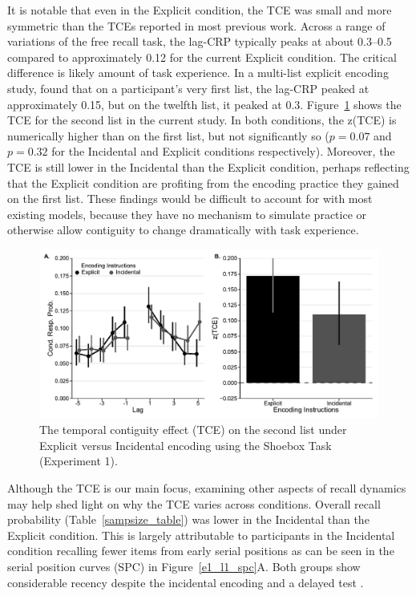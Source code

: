 \documentclass[man,natbib,floatsintext]{apa6} %
\begin{document}
\color{red}
\label{TODO-5}
It is notable that even in the Explicit condition, the TCE was small and more symmetric than the TCEs reported in most previous work. Across a range of variations of the free recall task, the lag-CRP typically peaks at about 0.3--0.5 \citep{HealKaha17} compared to approximately 0.12 for the current Explicit condition. The critical difference is likely amount of task experience. In a multi-list explicit encoding study, \citet{HealKaha17} found that on a participant's very first list, the lag-CRP peaked at approximately 0.15, but on the twelfth list, it peaked at 0.3. Figure~\ref{e1_l2_crp} shows the TCE for the second list in the current study. In both conditions, the z(TCE) is numerically higher than on the first list, but not significantly so ($p=0.07$ and $p=0.32$ for the Incidental and Explicit conditions respectively)\label{t1}. Moreover, the TCE is still lower in the Incidental than the Explicit condition, perhaps reflecting that the Explicit condition are profiting from the encoding practice they gained on the first list. These findings would be difficult to account for with most existing models, because they have no mechanism to simulate practice or otherwise allow contiguity to change dramatically with task experience.

\begin{figure}
\includegraphics{figures/E1_crp_list2.pdf}
\caption{The temporal contiguity effect (TCE) on the second list under Explicit versus Incidental encoding using the Shoebox Task (Experiment 1). \paneltext}
\label{e1_l2_crp}
\end{figure}

\color{black}


\color{red}
\label{TODO-6}
Although the TCE is our main focus, \label{SPCtalk} examining other aspects of recall dynamics may help shed light on why the TCE varies across conditions. Overall recall probability (Table~\ref{sampsize_table}) was lower in the Incidental than the Explicit condition. This is largely attributable to participants in the Incidental condition recalling fewer items from early serial positions as can be seen in the serial position curves (SPC) in Figure~\ref{e1_l1_spc}A. Both groups show considerable recency despite the incidental encoding and a delayed test \citep[for a similar findings, see][]{MarsWerd72,Neat93,GlenEtal80}.
\end{document}
